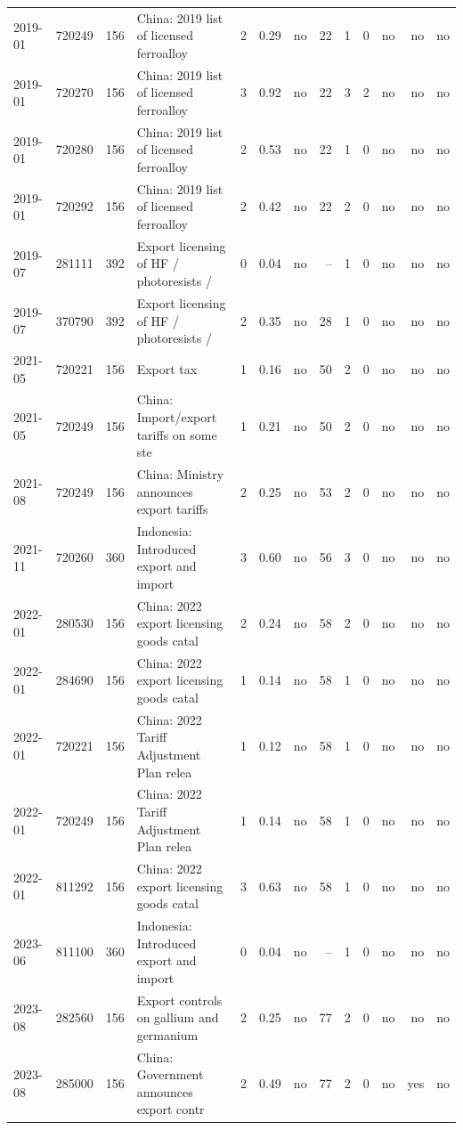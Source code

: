 \begin{minipage}{\linewidth}
\begin{tabular}{lllp{4.2cm}rrrrrrrrr}
2019-01 & 720249 & 156 & China: 2019 list of licensed ferroalloy  & 2 & 0.29 & no & 22 & 1 & 0 & no & no & no \\
2019-01 & 720270 & 156 & China: 2019 list of licensed ferroalloy  & 3 & 0.92 & no & 22 & 3 & 2 & no & no & no \\
2019-01 & 720280 & 156 & China: 2019 list of licensed ferroalloy  & 2 & 0.53 & no & 22 & 1 & 0 & no & no & no \\
2019-01 & 720292 & 156 & China: 2019 list of licensed ferroalloy  & 2 & 0.42 & no & 22 & 2 & 0 & no & no & no \\
2019-07 & 281111 & 392 & Export licensing of HF / photoresists /  & 0 & 0.04 & no & -- & 1 & 0 & no & no & no \\
2019-07 & 370790 & 392 & Export licensing of HF / photoresists /  & 2 & 0.35 & no & 28 & 1 & 0 & no & no & no \\
2021-05 & 720221 & 156 & Export tax & 1 & 0.16 & no & 50 & 2 & 0 & no & no & no \\
2021-05 & 720249 & 156 & China: Import/export tariffs on some ste & 1 & 0.21 & no & 50 & 2 & 0 & no & no & no \\
2021-08 & 720249 & 156 & China: Ministry announces export tariffs & 2 & 0.25 & no & 53 & 2 & 0 & no & no & no \\
2021-11 & 720260 & 360 & Indonesia: Introduced export and import  & 3 & 0.60 & no & 56 & 3 & 0 & no & no & no \\
2022-01 & 280530 & 156 & China: 2022 export licensing goods catal & 2 & 0.24 & no & 58 & 2 & 0 & no & no & no \\
2022-01 & 284690 & 156 & China: 2022 export licensing goods catal & 1 & 0.14 & no & 58 & 1 & 0 & no & no & no \\
2022-01 & 720221 & 156 & China: 2022 Tariff Adjustment Plan relea & 1 & 0.12 & no & 58 & 1 & 0 & no & no & no \\
2022-01 & 720249 & 156 & China: 2022 Tariff Adjustment Plan relea & 1 & 0.14 & no & 58 & 1 & 0 & no & no & no \\
2022-01 & 811292 & 156 & China: 2022 export licensing goods catal & 3 & 0.63 & no & 58 & 1 & 0 & no & no & no \\
2023-06 & 811100 & 360 & Indonesia: Introduced export and import  & 0 & 0.04 & no & -- & 1 & 0 & no & no & no \\
2023-08 & 282560 & 156 & Export controls on gallium and germanium & 2 & 0.25 & no & 77 & 2 & 0 & no & no & no \\
2023-08 & 285000 & 156 & China: Government announces export contr & 2 & 0.49 & no & 77 & 2 & 0 & no & yes & no \\

\end{tabular}
\end{minipage}
